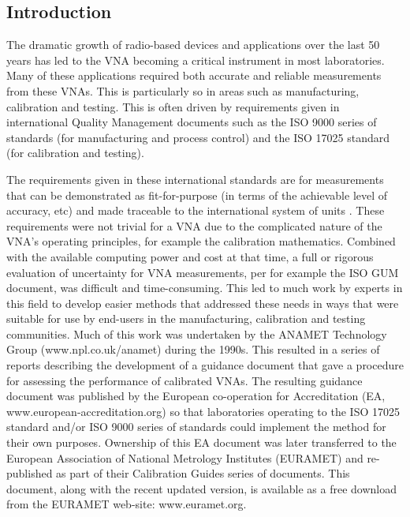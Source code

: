 \documentclass[../thesis/thesis.tex]{subfiles}
\begin{document}
\begin{refsection}
\section{Introduction}

The dramatic growth of radio-based devices and applications over the last 50 years has led to the VNA becoming a critical instrument in most laboratories. Many of these applications required both accurate and reliable measurements from these VNAs.  This is particularly so in areas such as manufacturing, calibration and testing.  This is often driven by requirements given in international Quality Management documents such as the ISO 9000 series of standards \cite{ISO9000} (for manufacturing and process control) and the ISO 17025 standard \cite{ISO17025} (for calibration and testing).

The requirements given in these international standards are for measurements that can be demonstrated as fit-for-purpose (in terms of the achievable level of accuracy, etc) and made traceable to the international system of units \cite{SI_2019, SI_2019B}.  These requirements were not trivial for a VNA due to the complicated nature of the VNA’s operating principles, for example the calibration mathematics. Combined with the available computing power and cost at that time, a full or rigorous evaluation of uncertainty for VNA measurements, per for example the ISO GUM document, was difficult and time-consuming. This led to much work by experts in this field to develop easier methods that addressed these needs in ways that were suitable for use by end-users in the manufacturing, calibration and testing communities.  Much of this work was undertaken by the ANAMET Technology Group (www.npl.co.uk/anamet) during the 1990s.  This resulted in a series of reports \cite{ANAMET_1996, ANAMET_1998, ANAMET_1999} describing the development of a guidance document that gave a procedure for assessing the performance of calibrated VNAs.  The resulting guidance document \cite{EA_2000} was published by the European co-operation for Accreditation (EA, www.european-accreditation.org) so that laboratories operating to the ISO 17025 standard and/or ISO 9000 series of standards could implement the method for their own purposes.  Ownership of this EA document was later transferred to the European Association of National Metrology Institutes (EURAMET) and re-published \cite{EURAMET_2011} as part of their Calibration Guides series of documents. This document, along with the recent updated version, is available as a free download from the EURAMET web-site: www.euramet.org.


\end{refsection}
\end{document}
